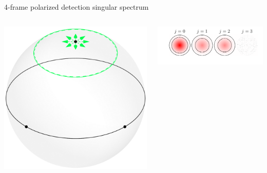 \documentclass[presentation]{beamer}
\begin{document}
\begin{frame}[label=sec-1]{4-frame polarized detection singular spectrum}
  \begin{columns}
    \begin{column}{0.25\textwidth}
      \centering
      \includegraphics[width=1.0\columnwidth]{pol_detect/scene.pdf}
    \end{column}
    \begin{column}{0.75\textwidth}
      \centering
      \includegraphics[width=1.0\columnwidth]{pol_detect/svs.pdf}
    \end{column}
  \end{columns}
\end{frame}
\end{document}
